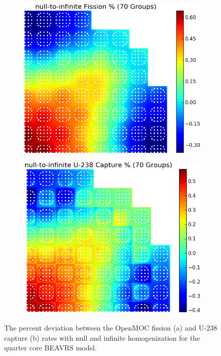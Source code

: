 \begin{appendices}
\begin{figure}[h!]
\centering
\begin{subfigure}{0.78\textwidth}
  \centering
  \includegraphics[width=\linewidth]{figures/patterns/appendix/compare-full-core/null-to-infinite/fiss-comp}  	 
  \caption{}
  \label{fig:compare-null-inf-fiss}
\end{subfigure}
\begin{subfigure}{0.78\textwidth}
  \centering
  \includegraphics[width=\linewidth]{figures/patterns/appendix/compare-full-core/null-to-infinite/capt-comp}  	 
  \caption{}
  \label{fig:compare-null-inf-capt}
\end{subfigure}
\caption[U-238 capture rate null-to-infinite relative deviation]{The percent deviation between the OpenMOC fission (a) and U-238 capture (b) rates with null and infinite homogenization for the quarter core \ac{BEAVRS} model.}
\label{fig:null-to-inf-full-core-dev}
\end{figure}


\end{appendices}
